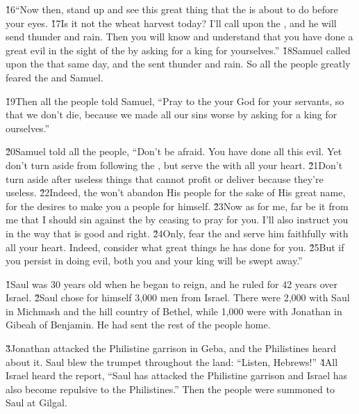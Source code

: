 \v{16}``Now then, stand up and see this great thing that the  is about to do before your eyes. \v{17}Is it not the wheat harvest today? I'll call upon the , and he will send thunder and rain. Then you will know and understand that you have done a great evil in the sight of the  by asking for a king for yourselves.'' \v{18}Samuel called upon the  that same day, and the  sent thunder and rain. So all the people greatly feared the  and Samuel.

\v{19}Then all the people told Samuel, ``Pray to the  your God for your servants, so that we don't die, because we made all our sins worse by asking for a king for ourselves.''

\v{20}Samuel told all the people, ``Don't be afraid. You have done all this evil. Yet don't turn aside from following the , but serve the  with all your heart. \v{21}Don't turn aside after useless things that cannot profit or deliver because they're useless. \v{22}Indeed, the  won't abandon His people for the sake of His great name, for the  desires to make you a people for himself. \v{23}Now as for me, far be it from me that I should sin against the  by ceasing to pray for you. I'll also instruct you in the way that is good and right. \v{24}Only, fear the  and serve him faithfully with all your heart. Indeed, consider what great things he has done for you. \v{25}But if you persist in doing evil, both you and your king will be swept away.''

\v{1}Saul was 30 years old when he began to reign, and he ruled for 42 years over Israel. \v{2}Saul chose for himself 3,000 men from Israel. There were 2,000 with Saul in Michmash and the hill country of Bethel, while 1,000 were with Jonathan in Gibeah of Benjamin. He had sent the rest of the people home.

\v{3}Jonathan attacked the Philistine garrison in Geba, and the Philistines heard about it. Saul blew the trumpet throughout the land: ``Listen, Hebrews!'' \v{4}All Israel heard the report, ``Saul has attacked the Philistine garrison and Israel has also become repulsive to the Philistines.'' Then the people were summoned to Saul at Gilgal.

